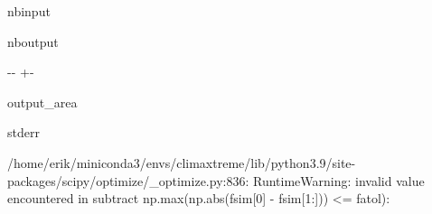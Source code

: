 \documentclass[a4paper,11pt,openany,english]{sphinxmanual}
\begin{document}
\begin{sphinxuseclass}{nbinput}
{
\begin{sphinxVerbatim}[commandchars=\\\{\}]
\llap{\color{nbsphinxin}[5]:\,\hspace{\fboxrule}\hspace{\fboxsep}}  
 
\end{sphinxVerbatim}
}

\end{sphinxuseclass}
\begin{sphinxuseclass}{nboutput}
{

\kern-\sphinxverbatimsmallskipamount\kern-\baselineskip
\kern+\FrameHeightAdjust\kern-\fboxrule
\vspace{\nbsphinxcodecellspacing}

\begin{sphinxuseclass}{output_area}
\begin{sphinxuseclass}{stderr}


\begin{sphinxVerbatim}[commandchars=\\\{\}]
/home/erik/miniconda3/envs/climaxtreme/lib/python3.9/site-packages/scipy/optimize/\_optimize.py:836: RuntimeWarning: invalid value encountered in subtract
  np.max(np.abs(fsim[0] - fsim[1:])) <= fatol):
\end{sphinxVerbatim}



\end{sphinxuseclass}
\end{sphinxuseclass}
}

\end{sphinxuseclass}
\end{document}
